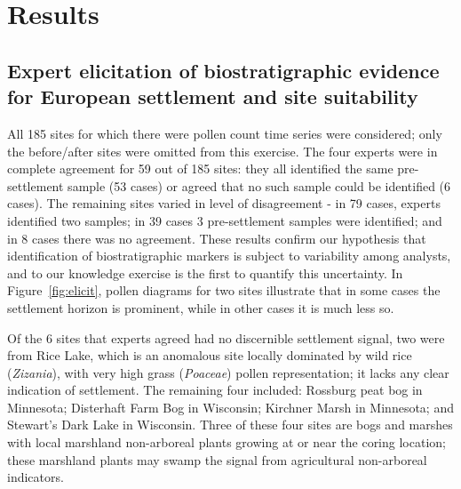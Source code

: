 \documentclass[12pt]{article}
\begin{document}


\section{Results}

\subsection{Expert elicitation of biostratigraphic evidence for European settlement and site suitability}

All 185 sites for which there were pollen count time series were
considered; only the before/after sites were omitted from this
exercise. The four experts were in complete agreement for 59 out of
185 sites: they all identified the same pre-settlement sample (53
cases) or agreed that no such sample could be identified (6
cases). The remaining sites varied in level of disagreement - in 79
cases, experts identified two samples; in 39 cases 3 pre-settlement
samples were identified; and in 8 cases there was no agreement. These
results confirm our hypothesis that identification of biostratigraphic
markers is subject to variability among analysts, and to our knowledge
exercise is the first to quantify this uncertainty. In
Figure~\ref{fig:elicit}, pollen diagrams for two sites illustrate that
in some cases the settlement horizon is prominent, while in other
cases it is much less so.

Of the 6 sites that experts agreed had no discernible settlement
signal, two were from Rice Lake, which is an anomalous site locally
dominated by wild rice (\textit{Zizania}), with very high grass
(\textit{Poaceae}) pollen representation; it lacks any clear
indication of settlement. The remaining four included: Rossburg peat
bog in Minnesota; Disterhaft Farm Bog in Wisconsin; Kirchner Marsh in
Minnesota; and Stewart’s Dark Lake in Wisconsin. Three of these four
sites are bogs and marshes with local marshland non-arboreal plants
growing at or near the coring location; these marshland plants may
swamp the signal from agricultural non-arboreal indicators.
\end{document}
